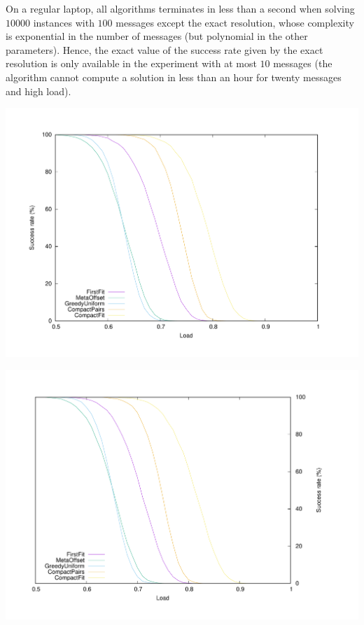 \documentclass[a4paper,UKenglish,cleveref, autoref, thm-restate]{lipics-v2019}
\begin{document}
On a regular laptop, all algorithms terminates in less than a second when solving $10000$ instances with $100$ messages except the exact resolution, whose complexity is exponential in the number of messages (but polynomial in the other parameters). Hence, the exact value of the success rate given by the exact resolution is only available in the experiment with at most $10$ messages (the algorithm cannot compute a solution in less than an hour for twenty messages and high load). 



\begin{minipage}[c]{.49\linewidth}

\begin{center}
\includegraphics[scale=0.275]{100messBig}

\label{fig:100messBig}
\end{center} 
\end{minipage}
\begin{minipage}[c]{.45\linewidth}
\begin{center}  
\includegraphics[scale=0.275]{100messSmall}
\label{fig:100messSmall}
\end{center}
\end{minipage}
\end{document}
